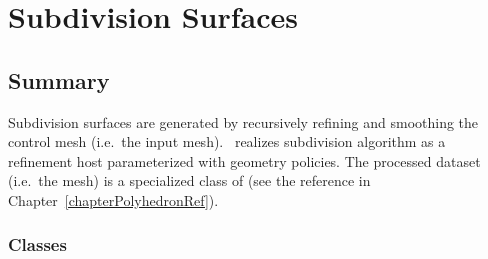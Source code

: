 
\chapter{Subdivision Surfaces}
\label{chapterSubdivisionRef}


\section*{Summary}

Subdivision surfaces are generated by recursively refining and smoothing 
the control mesh (i.e.~the input mesh). \ 
realizes subdivision algorithm as a refinement host parameterized 
with geometry policies. The processed dataset (i.e.~the mesh)
is a specialized class of  (see the reference in 
Chapter~\ref{chapterPolyhedronRef}).


\subsection*{Classes}

\\ 
\\ 
\\ 
\\ 
\\ 
\\ 
\\ 
\\ 

